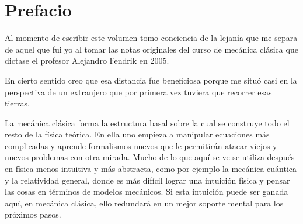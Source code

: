 \thispagestyle{empty}
\chapter*{Prefacio}

Al momento de escribir este volumen tomo conciencia de la lejanía que me separa de aquel que fui yo al tomar 
las notas originales del curso de mecánica clásica que dictase el profesor Alejandro Fendrik en 2005.

En cierto sentido creo que esa distancia fue beneficiosa porque me situó casi en la perspectiva de un
extranjero que por primera vez tuviera que recorrer esas tierras.

La mecánica clásica forma la estructura basal sobre la cual se construye todo el resto de la física teórica. 
En ella uno empieza a manipular ecuaciones más complicadas y aprende formalismos nuevos que le permitirán atacar
viejos y nuevos problemas con otra mirada. Mucho de lo que aquí se ve se utiliza después en física menos
intuitiva y más abstracta, como por ejemplo la mecánica cuántica y la relatividad general, donde es más difícil 
lograr una intuición física y pensar las cosas en términos de modelos mecánicos. 
Si esta intuición puede ser ganada aquí, en mecánica clásica, ello redundará en un mejor soporte mental para los
próximos pasos.


